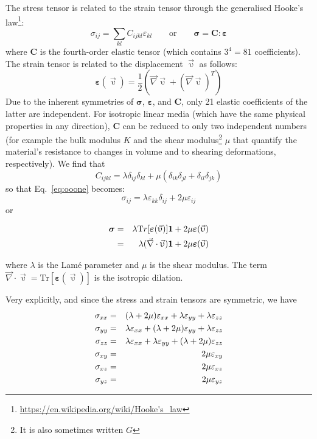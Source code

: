The stress tensor is related to the strain tensor through the generalised 
Hooke's law\footnote{\url{https://en.wikipedia.org/wiki/Hooke's_law}}:
\begin{equation}
\sigma_{ij}=\sum_{kl}C_{ijkl}\varepsilon_{kl} 
\qquad
\text{or}
\qquad
{\bm \sigma} = {\bm C} : {\bm \varepsilon}
\label{eq:ooone}
\end{equation}
where ${\bm C}$ is the fourth-order elastic tensor (which contains $3^4=81$ coefficients).
The strain tensor is related to the displacement $\vec{\upupsilon}$ as follows: 
\begin{equation}
{\bm \varepsilon}(\vec{\upupsilon}) 
= \frac{1}{2}(\vec{\nabla}\vec{\upupsilon} + (\vec{\nabla}\vec{\upupsilon})^T)
\end{equation}
Due to the inherent symmetries of ${\bm \sigma}$, ${\bm \varepsilon}$, and ${\bm C}$, 
only 21 elastic coefficients of the latter are independent. For isotropic linear media (which have the same physical properties in any direction), ${\bm C}$ can be reduced to only two independent numbers (for example the bulk modulus $K$ and the shear modulus\footnote{It is also sometimes written $G$} $\mu$ that quantify the material's resistance to changes in volume and to shearing deformations, respectively).
We find that
\[
C_{ijkl} = \lambda \delta_{ij}\delta_{kl} + \mu (\delta_{ik}\delta_{jl}+\delta_{il}\delta_{jk})
\]
so that Eq.~\eqref{eq:ooone} becomes:
\[
\sigma_{ij}=\lambda \varepsilon_{kk} \delta_{ij} + 2\mu \varepsilon_{ij}
\]
or
\begin{mdframed}[backgroundcolor=blue!5]
\begin{eqnarray}
{\bm \sigma}
&=&\lambda {\text Tr}[{\bm \varepsilon}(\vec{\upupsilon})] {\bm 1} 
+2\mu {\bm \varepsilon}(\vec{\upupsilon})
\nonumber\\
&=&\lambda (\vec{\nabla}\cdot\vec{\upupsilon}) {\bm 1} +2\mu {\bm \varepsilon}(\vec{\upupsilon}) 
\label{eq:twooELAST}
\end{eqnarray}
\end{mdframed}
where $\lambda$ is the Lam\'e parameter and $\mu$ is the shear modulus. The term $\vec{\nabla}\cdot\vec{\upupsilon}=\text{Tr}[{\bm \varepsilon}(\vec{\upupsilon})]$ is the isotropic dilation.

Very explicitly, and since the stress and strain tensors are symmetric, we have
\begin{eqnarray}
\sigma_{xx} &=& (\lambda+2\mu)  \varepsilon_{xx} + \lambda \varepsilon_{yy} + \lambda \varepsilon_{zz} \nonumber\\
\sigma_{yy} &=& \lambda \varepsilon_{xx} + (\lambda+2\mu)  {\varepsilon}_{yy} + \lambda \varepsilon_{zz}\nonumber\\
\sigma_{zz} &=& \lambda \varepsilon_{xx} + \lambda \varepsilon_{yy} + (\lambda+2\mu)  {\varepsilon}_{zz} \nonumber\\
\sigma_{xy} &=& 2\mu  {\varepsilon}_{xy} \nonumber\\
\sigma_{xz} &=& 2\mu  {\varepsilon}_{xz} \nonumber\\
\sigma_{yz} &=& 2\mu  {\varepsilon}_{yz} 
\end{eqnarray}



